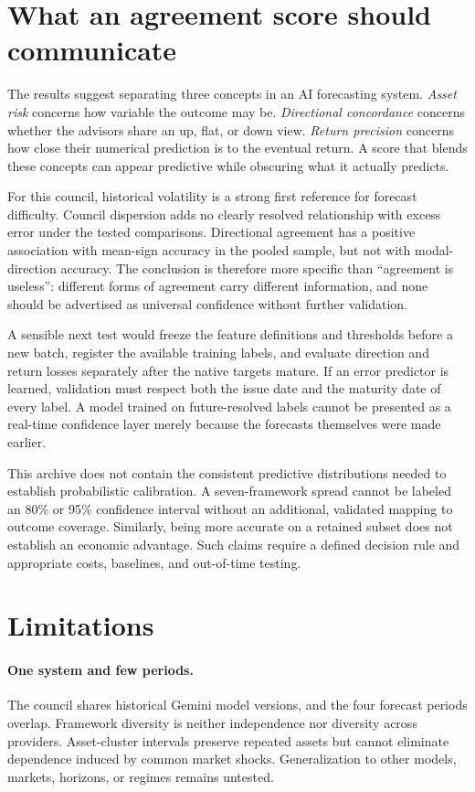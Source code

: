 \documentclass[11pt]{article}
\begin{document}
\section{What an agreement score should communicate}
The results suggest separating three concepts in an AI forecasting system. \emph{Asset risk} concerns how variable the outcome may be. \emph{Directional concordance} concerns whether the advisors share an up, flat, or down view. \emph{Return precision} concerns how close their numerical prediction is to the eventual return. A score that blends these concepts can appear predictive while obscuring what it actually predicts.

For this council, historical volatility is a strong first reference for forecast difficulty. Council dispersion adds no clearly resolved relationship with excess error under the tested comparisons. Directional agreement has a positive association with mean-sign accuracy in the pooled sample, but not with modal-direction accuracy. The conclusion is therefore more specific than ``agreement is useless'': different forms of agreement carry different information, and none should be advertised as universal confidence without further validation.

A sensible next test would freeze the feature definitions and thresholds before a new batch, register the available training labels, and evaluate direction and return losses separately after the native targets mature. If an error predictor is learned, validation must respect both the issue date and the maturity date of every label. A model trained on future-resolved labels cannot be presented as a real-time confidence layer merely because the forecasts themselves were made earlier.

This archive does not contain the consistent predictive distributions needed to establish probabilistic calibration. A seven-framework spread cannot be labeled an 80\% or 95\% confidence interval without an additional, validated mapping to outcome coverage. Similarly, being more accurate on a retained subset does not establish an economic advantage. Such claims require a defined decision rule and appropriate costs, baselines, and out-of-time testing.

\section{Limitations}
\paragraph{One system and few periods.} The council shares historical Gemini model versions, and the four forecast periods overlap. Framework diversity is neither independence nor diversity across providers. Asset-cluster intervals preserve repeated assets but cannot eliminate dependence induced by common market shocks. Generalization to other models, markets, horizons, or regimes remains untested.
\end{document}
